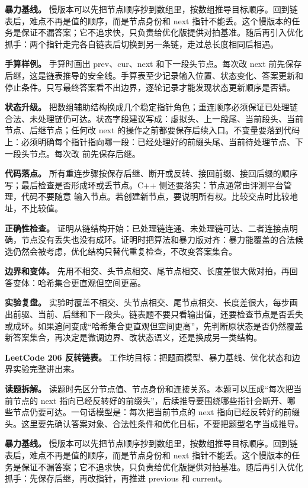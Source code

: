 \textbf{暴力基线。} 慢版本可以先把节点顺序抄到数组里，按数组推导目标顺序。回到链表后，难点不再是值的顺序，而是节点身份和 next 指针不能丢。这个慢版本的任务是保证不漏答案；它不追求快，只负责给优化版提供对拍基准。随后再引入优化抓手：两个指针走完各自链表后切换到另一条链，走过总长度相同后相遇。

\textbf{手算样例。} 手算时画出 prev、cur、next 和下一段头节点。每次改 next 前先保存后继，这是链表推导的安全线。手算表至少记录输入位置、状态变化、答案更新和停止条件。只写最终答案看不出边界，逐轮记录才能发现状态更新顺序是否错。

\textbf{状态升级。} 把数组辅助结构换成几个稳定指针角色；重连顺序必须保证已处理链合法、未处理链仍可达。状态字段建议写成：虚拟头、上一段尾、当前段头、当前节点、后继节点；任何改 next 的操作之前都要保存后续入口。不变量要落到代码上：必须明确每个指针指向哪一段：已经处理好的前缀头尾、当前待处理节点、下一段头节点。每次改  前先保存后继。

\textbf{代码落点。} 所有重连步骤按保存后继、断开或反转、接回前缀、接回后缀的顺序写；最后检查是否形成环或丢节点。C++ 侧还要落实：节点通常由评测平台管理，代码不要随意  输入节点。若创建新节点，要说明所有权。比较交点时比较地址，不比较值。

\textbf{正确性检查。} 证明从链结构开始：已处理链连通、未处理链可达、二者连接点明确，节点没有丢失也没有成环。证明时把算法和暴力版对齐：暴力能覆盖的合法候选仍然会被考虑，优化结构只替代重复检查，不改变答案集合。

\textbf{边界和变体。} 先用不相交、头节点相交、尾节点相交、长度差很大做对拍，再回答变体：哈希集合更直观但空间更高。

\textbf{实验复盘。} 实验时覆盖不相交、头节点相交、尾节点相交、长度差很大，每步画出前驱、当前、后继和下一段头。链表题不要只看输出值，还要检查节点是否丢失或成环。如果追问变成“哈希集合更直观但空间更高”，先判断原状态是否仍然覆盖新答案集合，再决定是微调边界、改状态语义，还是换成另一类结构。

\noindent\textbf{LeetCode 206 反转链表。} 工作坊目标：把题面模型、暴力基线、优化状态和边界实验完整讲出来。

\textbf{读题拆解。} 读题时先区分节点值、节点身份和连接关系。本题可以压成“每次把当前节点的 next 指向已经反转好的前缀头”，后续推导要围绕哪些指针会断开、哪些节点仍要可达。一句话模型是：每次把当前节点的 next 指向已经反转好的前缀头。这里要先确认答案对象、合法性条件和优化目标，不要把题型名字当成推导。

\textbf{暴力基线。} 慢版本可以先把节点顺序抄到数组里，按数组推导目标顺序。回到链表后，难点不再是值的顺序，而是节点身份和 next 指针不能丢。这个慢版本的任务是保证不漏答案；它不追求快，只负责给优化版提供对拍基准。随后再引入优化抓手：先保存后继，再改指针，再推进 previous 和 current。

